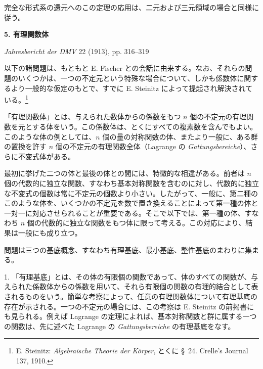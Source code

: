 \documentclass[11pt]{jlreq}
\begin{document}
完全な形式系の還元へのこの定理の応用は、二元および三元領域の場合と同様に従う。

\clearpage
\providecommand{\Kfield}{\mathfrak{K}}
\providecommand{\Ssys}{\mathfrak{S}}
\providecommand{\Mfield}{\mathfrak{M}}
\providecommand{\tq}{\tau}
\providecommand{\Lsys}{\mathfrak{L}}
\providecommand{\Jdom}{\mathfrak{J}}
\providecommand{\ds}{\displaystyle}

\begin{center}
{\Large\bfseries 5. 有理関数体}\par
\vspace{1.2em}
\emph{Jahresbericht der DMV} 22 (1913), pp. 316--319
\end{center}

\vspace{1.5em}

以下の諸問題は、もともと E. Fischer との会話に由来する。なお、それらの問題のいくつかは、一つの不定元という特殊な場合について、しかも係数体に関するより一般的な仮定のもとで、すでに E. Steinitz によって提起され解決されている。\footnote{E. Steinitz: \emph{Algebraische Theorie der Körper}, とくに \S\ 24. Crelle's Journal 137, 1910.}

「有理関数体」とは、与えられた数体からの係数をもつ $n$ 個の不定元の有理関数を元とする体をいう。この係数体は、とくにすべての複素数を含んでもよい。このような体の例としては、$n$ 個の量の対称関数の体、またより一般に、ある群の置換を許す $n$ 個の不定元の有理関数全体（Lagrange の \emph{Gattungsbereiche}）、さらに不変式体がある。

最初に挙げた二つの体と最後の体との間には、特徴的な相違がある。前者は $n$ 個の代数的に独立な関数、すなわち基本対称関数を含むのに対し、代数的に独立な不変式の個数は常に不定元の個数より小さい。したがって、一般に、第二種のこのような体を、いくつかの不定元を数で置き換えることによって第一種の体と一対一に対応させられることが重要である。そこで以下では、第一種の体、すなわち $n$ 個の代数的に独立な関数をもつ体に限って考える。この対応により、結果は一般にも成り立つ。

問題は三つの基底概念、すなわち有理基底、最小基底、整性基底のまわりに集まる。

1. 「有理基底」とは、その体の有限個の関数であって、体のすべての関数が、与えられた係数体からの係数を用いて、それら有限個の関数の有理的結合として表されるものをいう。簡単な考察によって、任意の有理関数体について有理基底の存在が示される。一つの不定元の場合には、この考察は E. Steinitz の前掲書にも見られる。例えば Lagrange の定理によれば、基本対称関数と群に属する一つの関数は、先に述べた Lagrange の \emph{Gattungsbereiche} の有理基底をなす。
\end{document}
